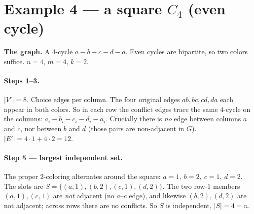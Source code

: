 \documentclass[11pt]{article}
\begin{document}
\section{Example 4 --- a square \texorpdfstring{$C_4$}{C4} (even cycle)}

\textbf{The graph.} A $4$-cycle $a-b-c-d-a$. Even cycles are bipartite, so two
colors suffice. $n=4$, $m=4$, $k=2$.

\begin{center}
\end{center}

\paragraph{Steps 1--3.} $|V'|=8$. Choice edges per column. The four original
edges $ab,bc,cd,da$ each appear in both colors. So in each row the conflict edges
trace the same $4$-cycle on the columns: $a_i-b_i-c_i-d_i-a_i$. Crucially there is
\emph{no} edge between columns $a$ and $c$, nor between $b$ and $d$ (those pairs
are non-adjacent in $G$). $|E'| = 4\cdot 1 + 4\cdot 2 = 12$.

\begin{center}
\end{center}

\paragraph{Step 5 --- largest independent set.} The proper $2$-coloring alternates
around the square: $a=1,\ b=2,\ c=1,\ d=2$. The slots are
$S=\{(a,1),(b,2),(c,1),(d,2)\}$. The two row-$1$ members $(a,1),(c,1)$ are
\emph{not} adjacent (no $a$--$c$ edge), and likewise $(b,2),(d,2)$ are not
adjacent; across rows there are no conflicts. So $S$ is independent, $|S|=4=n$.
\end{document}
